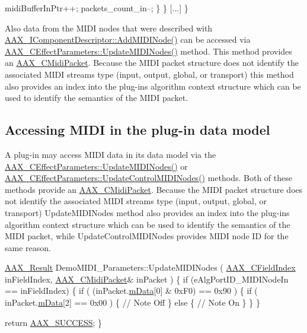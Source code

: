 \begin{DoxyCode}
            midiBufferInPtr++;
            packets\_count\_in--;
        \}
    \}
    [...]
\}   
\end{DoxyCode}


Also data from the M\+I\+D\+I nodes that were described with \hyperlink{a00088_a6284dda9ccca898e33075de29dad4e39}{A\+A\+X\+\_\+\+I\+Component\+Descriptor\+::\+Add\+M\+I\+D\+I\+Node()} can be accessed via \hyperlink{a00018_a900a8fcf7d2e0bebda33e5ac393019c2}{A\+A\+X\+\_\+\+C\+Effect\+Parameters\+::\+Update\+M\+I\+D\+I\+Nodes()} method. This method provides an \hyperlink{a00024}{A\+A\+X\+\_\+\+C\+Midi\+Packet}. Because the M\+I\+D\+I packet structure does not identify the associated M\+I\+D\+I stream\textquotesingle{}s type (input, output, global, or transport) this method also provides an index into the plug-\/in\textquotesingle{}s algorithm context structure which can be used to identify the semantics of the M\+I\+D\+I packet.\hypertarget{a00336_additionalFeatures_MIDI_DataModel}{}\subsection{Accessing M\+I\+D\+I in the plug-\/in data model}\label{a00336_additionalFeatures_MIDI_DataModel}
A plug-\/in may access M\+I\+D\+I data in its data model via the \hyperlink{a00018_a900a8fcf7d2e0bebda33e5ac393019c2}{A\+A\+X\+\_\+\+C\+Effect\+Parameters\+::\+Update\+M\+I\+D\+I\+Nodes()} or \hyperlink{a00018_aeaaaad6ff1a84c8fc66dcdfd8bc430c5}{A\+A\+X\+\_\+\+C\+Effect\+Parameters\+::\+Update\+Control\+M\+I\+D\+I\+Nodes()} methods. Both of these methods provide an \hyperlink{a00024}{A\+A\+X\+\_\+\+C\+Midi\+Packet}. Because the M\+I\+D\+I packet structure does not identify the associated M\+I\+D\+I stream\textquotesingle{}s type (input, output, global, or transport) Update\+M\+I\+D\+I\+Nodes method also provides an index into the plug-\/in\textquotesingle{}s algorithm context structure which can be used to identify the semantics of the M\+I\+D\+I packet, while Update\+Control\+M\+I\+D\+I\+Nodes provides M\+I\+D\+I node I\+D for the same reason.


\begin{DoxyCode}
\hyperlink{a00149_a4d8f69a697df7f70c3a8e9b8ee130d2f}{AAX\_Result} DemoMIDI\_Parameters::UpdateMIDINodes ( \hyperlink{a00149_ae807f8986143820cfb5d6da32165c9c7}{AAX\_CFieldIndex} inFieldIndex,    
      \hyperlink{a00024}{AAX\_CMidiPacket}& inPacket )
\{   
    \textcolor{keywordflow}{if} (eAlgPortID\_MIDINodeIn == inFieldIndex)
    \{
        \textcolor{keywordflow}{if} ( (inPacket.\hyperlink{a00024_aac7229afc36006bc673eb219b18d8220}{mData}[0] & 0xF0) == 0x90 )
        \{
            \textcolor{keywordflow}{if} ( inPacket.\hyperlink{a00024_aac7229afc36006bc673eb219b18d8220}{mData}[2] == 0x00 )
            \{
                \textcolor{comment}{//  Note Off}
            \}
            \textcolor{keywordflow}{else}
            \{
                \textcolor{comment}{// Note On}
            \}
        \}
    \}
    
    \textcolor{keywordflow}{return} \hyperlink{a00207_a5f8c7439f3a706c4f8315a9609811937aeddbd1bb67e3a66e6af54a4b4a7a57b3}{AAX\_SUCCESS};
\}
\end{DoxyCode}


